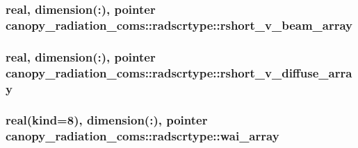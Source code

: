 \subsubsection[{\texorpdfstring{rshort\+\_\+v\+\_\+beam\+\_\+array}{rshort_v_beam_array}}]{\setlength{\rightskip}{0pt plus 5cm}real, dimension(\+:), pointer canopy\+\_\+radiation\+\_\+coms\+::radscrtype\+::rshort\+\_\+v\+\_\+beam\+\_\+array}\hypertarget{structcanopy__radiation__coms_1_1radscrtype_a547dba35e7798a3c9625bd7f9a2142f0}{}\label{structcanopy__radiation__coms_1_1radscrtype_a547dba35e7798a3c9625bd7f9a2142f0}
\subsubsection[{\texorpdfstring{rshort\+\_\+v\+\_\+diffuse\+\_\+array}{rshort_v_diffuse_array}}]{\setlength{\rightskip}{0pt plus 5cm}real, dimension(\+:), pointer canopy\+\_\+radiation\+\_\+coms\+::radscrtype\+::rshort\+\_\+v\+\_\+diffuse\+\_\+array}\hypertarget{structcanopy__radiation__coms_1_1radscrtype_a62fabe994c5500ee0323d107c7c484f1}{}\label{structcanopy__radiation__coms_1_1radscrtype_a62fabe994c5500ee0323d107c7c484f1}
\subsubsection[{\texorpdfstring{wai\+\_\+array}{wai_array}}]{\setlength{\rightskip}{0pt plus 5cm}real(kind=8), dimension(\+:), pointer canopy\+\_\+radiation\+\_\+coms\+::radscrtype\+::wai\+\_\+array}\hypertarget{structcanopy__radiation__coms_1_1radscrtype_ac153a4fd9eb5dd14f9b2b77de6ea9a7e}{}\label{structcanopy__radiation__coms_1_1radscrtype_ac153a4fd9eb5dd14f9b2b77de6ea9a7e}
